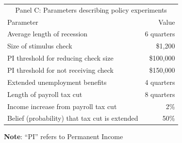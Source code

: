 \documentclass{econsocart}
\begin{document}
\begin{table}[tb]
  \begin{tabular*}
    {\textwidth}{@{\extracolsep{\fill}}lr@{}}
    \multicolumn{2}{c}{\small Panel C: Parameters describing policy experiments} \\
    \addlinespace
    \hline
    Parameter                                        & Value \\ \hline
    Average length of recession                      & 6 quarters \\
    Size of stimulus check                           & \$1,200 \\
    PI threshold for reducing check size             & \$100,000 \\
    PI threshold for not receiving check             & \$150,000 \\
    Extended unemployment benefits                   & 4 quarters \\
    Length of payroll tax cut                        & 8 quarters \\
    Income increase from payroll tax cut             & 2\% \\
    Belief (probability) that tax cut is extended    & 50\% \\
    \hline
  \end{tabular*}

  \vspace{0.5em}
  \noindent\parbox{\textwidth}{\footnotesize
    \textbf{Note}: ``PI'' refers to Permanent Income}
  \vspace{0.5em}
\end{table}
\end{document}
